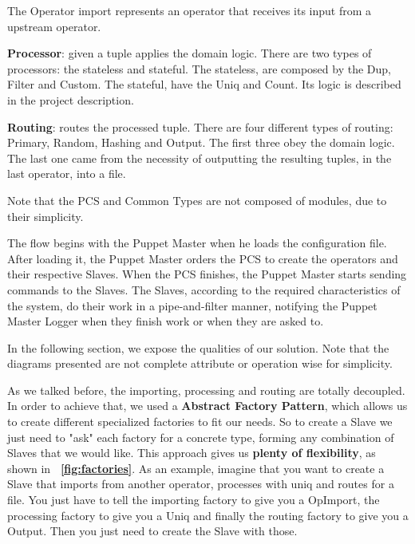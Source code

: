 \documentclass[times, 10pt,twocolumn]{article}
\begin{document}
The Operator import represents an operator that receives its input from a upstream operator.

\textbf{Processor}: given a tuple applies the domain logic. There are two types of processors: the stateless and stateful. The stateless, are composed by the Dup, Filter and Custom. The stateful, have the Uniq and Count. Its logic is described in the project description.

\textbf{Routing}: routes the processed tuple. There are four different types of routing: Primary, Random, Hashing and Output. The first three obey the domain logic. The last one came from the necessity of outputting the resulting tuples, in the last operator, into a file. 

Note that the PCS and Common Types are not composed of modules, due to their simplicity.



The flow begins with the Puppet Master when he loads the configuration file. After loading it, the Puppet Master orders the PCS to create the operators and their respective Slaves. When the PCS finishes, the Puppet Master starts sending commands to the Slaves. The Slaves, according to the required characteristics of the system, do their work in a pipe-and-filter manner, notifying the Puppet Master Logger when they finish work or when they are asked to.



In the following section, we expose the qualities of our solution. Note that the diagrams presented are not complete attribute or operation wise for simplicity.

As we talked before, the importing, processing and routing are totally decoupled. In order to achieve that, we used a \textbf{Abstract Factory Pattern}, which allows us to create different specialized factories to fit our needs. So to create a Slave we just need to "ask" each factory for a concrete type, forming any combination of Slaves that we would like. This approach gives us \textbf{plenty of flexibility}, as shown in \textbf{~\cref{fig:factories}}. As an example, imagine that you want to create a Slave that imports from another operator, processes with uniq and routes for a file. You just have to tell the importing factory to give you a OpImport, the processing factory to give you a Uniq and finally the routing factory to give you a Output. Then you just need to create the Slave with those.
\end{document}
